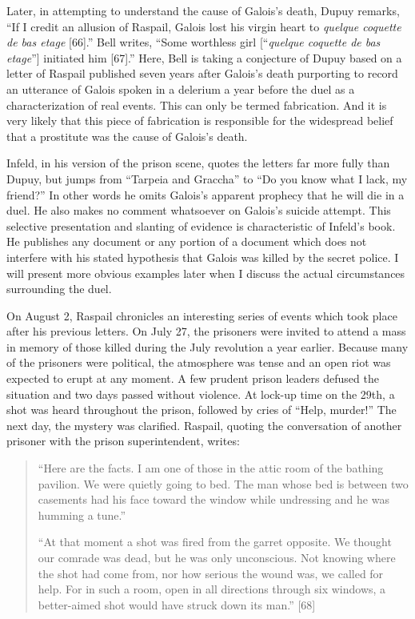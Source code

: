 \documentclass[12pt]{article}
\begin{document}
Later, in attempting to understand the cause of Galois's death, Dupuy remarks, ``If I credit an allusion of Raspail, Galois lost his virgin heart to {\it quelque coquette de bas etage} [66].'' Bell writes, ``Some worthless girl [``\emph{quelque coquette de bas etage}''] initiated him [67].'' Here, Bell is taking a conjecture of Dupuy based on a letter of Raspail published seven years after Galois's death purporting to record an utterance of Galois spoken in a delerium a year before the duel as a characterization of real events. This can only be termed fabrication. And it is very likely that this piece of fabrication is responsible for the widespread belief that a prostitute was the cause of Galois's death.

Infeld, in his version of the prison scene, quotes the letters far more fully than Dupuy, but jumps from ``Tarpeia and Graccha'' to ``Do you know what I lack, my friend?'' In other words he omits Galois's apparent prophecy that he will die in a duel. He also makes no comment whatsoever on Galois's suicide attempt. This selective presentation and slanting of evidence is characteristic of Infeld's book. He publishes any document or any portion of a document which does not interfere with his stated hypothesis that Galois was killed by the secret police. I will present more obvious examples later when I discuss the actual circumstances surrounding the duel.

On August 2, Raspail chronicles an interesting series of events which took place after his previous letters. On July 27, the prisoners were invited to attend a mass in memory of those killed during the July revolution a year earlier. Because many of the prisoners were political, the atmosphere was tense and an open riot was expected to erupt at any moment. A few prudent prison leaders defused the situation and two days passed without violence. At lock-up time on the 29th, a shot was heard throughout the prison, followed by cries of ``Help, murder!'' The next day, the mystery was clarified. Raspail, quoting the conversation of another prisoner with the prison superintendent, writes:

\begin{quotation}
``Here are the facts. I am one of those in the attic room of the bathing pavilion. We were quietly going to bed. The man whose bed is between two casements had his face toward the window while undressing and he was humming a tune.''

``At that moment a shot was fired from the garret opposite. We thought our comrade was dead, but he was only unconscious. Not knowing where the shot had come from, nor how serious the wound was, we called for help. For in such a room, open in all directions through six windows, a better-aimed shot would have struck down its man.'' [68]
\end{quotation}
\end{document}

